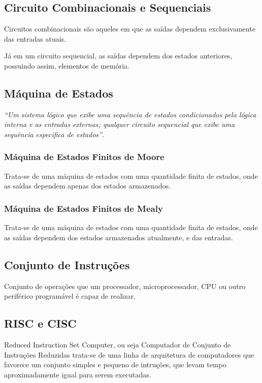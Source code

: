 \subsection{Circuito Combinacionais e Sequenciais}

Circuitos combinacionais são aqueles em que as saídas dependem
exclusivamente das entradas atuais.

Já em um circuito sequencial, as saídas dependem dos estados
anteriores, possuindo assim, elementos de memória.

\subsection{Máquina de Estados}

\textit{“Um sistema lógico que exibe uma sequência de estados condicionados
pela lógica interna e as entradas externas; qualquer circuito sequencial que
exibe uma sequência especifica de estados”}.
\citep[p.496]{floyd2009sistemas}

\subsubsection{Máquina de Estados Finitos de Moore}

Trata-se de uma máquina de estados com uma quantidade finita de
estados, onde as saídas dependem apenas dos estados armazenados.

\subsubsection{Máquina de Estados Finitos de Mealy}

Trata-se de uma máquina de estados com uma quantidade finita de
estados, onde as saídas dependem dos estados armazenados atualmente, e
das entradas.

\subsection{Conjunto de Instruções}

Conjunto de operações que um processador, microprocessador, CPU ou
outro periférico programável é capaz de realizar.

\subsection{RISC e CISC}

Reduced Instruction Set Computer, ou seja Computador de Conjunto de
Instruções Reduzidas trata-se de uma linha de arquitetura de computadores
que favorece um conjunto simples e pequeno de intruções, que levam tempo
aproximadamente igual para serem executadas.

